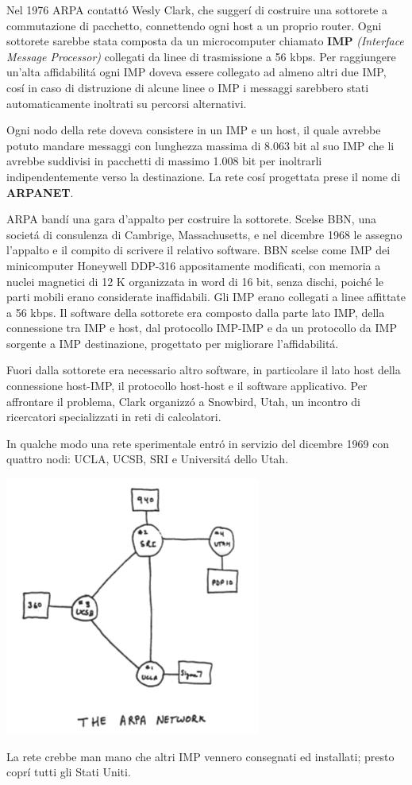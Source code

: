 \documentclass[12pt]{article}
\begin{document}
Nel 1976 ARPA contatt\'o Wesly Clark, che sugger\'i di costruire una sottorete a commutazione di pacchetto, connettendo 
ogni host a un proprio router. Ogni sottorete sarebbe stata composta da un microcomputer chiamato \textbf{IMP} \textit{(Interface 
Message Processor)} collegati da linee di trasmissione a 56 kbps. Per raggiungere un'alta affidabilit\'a ogni IMP doveva essere 
collegato ad almeno altri due IMP, cos\'i in caso di distruzione di alcune linee o IMP i messaggi sarebbero stati automaticamente 
inoltrati su percorsi alternativi.

Ogni nodo della rete doveva consistere in un IMP e un host, il quale avrebbe potuto mandare messaggi con lunghezza massima di 8.063 
bit al suo IMP che li avrebbe suddivisi in pacchetti di massimo 1.008 bit per inoltrarli indipendentemente verso la destinazione.
La rete cos\'i progettata prese il nome di \textbf{ARPANET}.

ARPA band\'i una gara d'appalto per costruire la sottorete. Scelse BBN, una societ\'a di consulenza di Cambrige, Massachusetts, e 
nel dicembre 1968 le assegno l'appalto e il compito di scrivere il relativo software. BBN scelse come IMP dei minicomputer 
Honeywell DDP-316 appositamente modificati, con memoria a nuclei magnetici di 12 K organizzata in word di 16 bit, senza dischi, 
poich\'e le parti mobili erano considerate inaffidabili. Gli IMP erano collegati a linee affittate a 56 kbps. Il software della 
sottorete era composto dalla parte lato IMP, della connessione tra IMP e host, dal protocollo IMP-IMP e da un protocollo da IMP 
sorgente a IMP destinazione, progettato per migliorare l'affidabilit\'a.

Fuori dalla sottorete era necessario altro software, in particolare il lato host della connessione host-IMP, il protocollo host-host 
e il software applicativo. Per affrontare il problema, Clark organizz\'o a Snowbird, Utah, un incontro di ricercatori specializzati in 
reti di calcolatori.

In qualche modo una rete sperimentale entr\'o in servizio del dicembre 1969 con quattro nodi: UCLA, UCSB, SRI e Universit\'a dello 
Utah.
\begin{center}
	\includegraphics[scale=0.5]{introduzione-img16.png}
\end{center}
La rete crebbe man mano che altri IMP vennero consegnati ed installati; presto copr\'i tutti gli Stati Uniti.
\end{document}
